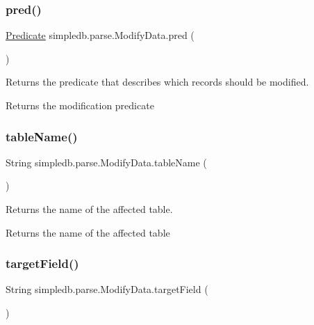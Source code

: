 \subsubsection{\texorpdfstring{pred()}{pred()}}
{\footnotesize\ttfamily \hyperlink{classsimpledb_1_1query_1_1Predicate}{Predicate} simpledb.\+parse.\+Modify\+Data.\+pred (\begin{DoxyParamCaption}{ }\end{DoxyParamCaption})\hspace{0.3cm}{\ttfamily [inline]}}

Returns the predicate that describes which records should be modified. \begin{DoxyReturn}{Returns}
the modification predicate 
\end{DoxyReturn}
\mbox{\label{classsimpledb_1_1parse_1_1ModifyData_a34e80328d0a9fdbcb906908328c854c9}} 
\subsubsection{\texorpdfstring{table\+Name()}{tableName()}}
{\footnotesize\ttfamily String simpledb.\+parse.\+Modify\+Data.\+table\+Name (\begin{DoxyParamCaption}{ }\end{DoxyParamCaption})\hspace{0.3cm}{\ttfamily [inline]}}

Returns the name of the affected table. \begin{DoxyReturn}{Returns}
the name of the affected table 
\end{DoxyReturn}
\mbox{\label{classsimpledb_1_1parse_1_1ModifyData_a54ff6b92596e40f3fc297e23c5cd8dc1}} 
\subsubsection{\texorpdfstring{target\+Field()}{targetField()}}
{\footnotesize\ttfamily String simpledb.\+parse.\+Modify\+Data.\+target\+Field (\begin{DoxyParamCaption}{ }\end{DoxyParamCaption})\hspace{0.3cm}{\ttfamily [inline]}}

